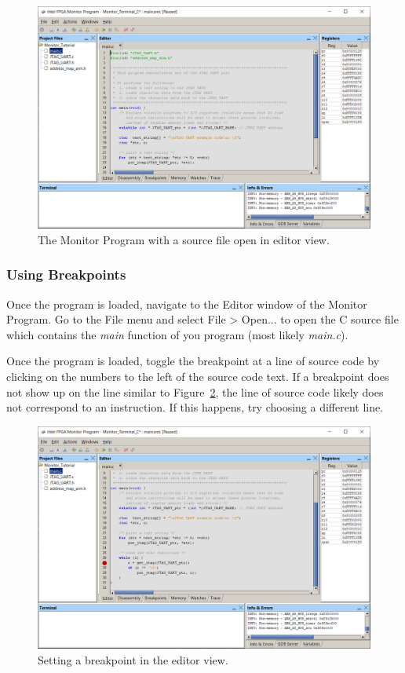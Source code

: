 \documentclass[11pt, twoside, pdftex]{article}
\begin{document}
\begin{figure}[H]
   \begin{center}
      \includegraphics[scale=0.6]{screenshots/figure24.png}
   \end{center}
   \caption{The Monitor Program with a source file open in editor view.}
	 \label{fig:24}
\end{figure}

\subsubsection{Using Breakpoints}
Once the program is loaded, navigate to the {\sf Editor} window of the Monitor Program.
Go to the File menu and select {\sf File > Open...} to open the C source file which contains the {\it main} 
function of you program (most likely {\it main.c}).

Once the program is loaded, toggle the breakpoint at a line of source code by clicking on the numbers to the 
left of the source code text. If a breakpoint does not show up on the line similar to Figure~\ref{fig:25}, the line of source code 
likely does not correspond to an instruction. If this happens, try choosing a different line.

\begin{figure}[H]
   \begin{center}
      \includegraphics[scale=0.6]{screenshots/figure25.png}
   \end{center}
   \caption{Setting a breakpoint in the editor view.}
	 \label{fig:25}
\end{figure}
\end{document}
